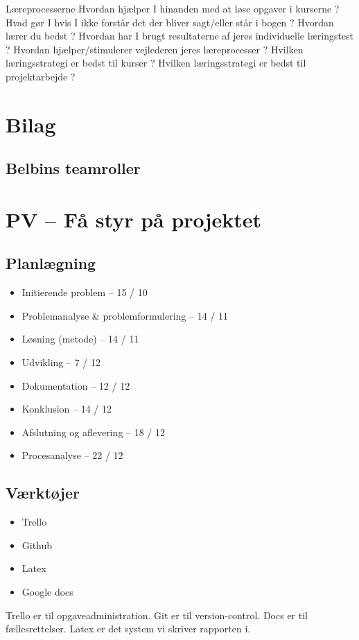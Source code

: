 \documentclass[oneside,a4paper,titlepage]{article}
\begin{document}
Læreprocesserne
Hvordan hjælper I hinanden med at løse opgaver i kurserne ?
Hvad gør I hvis I ikke forstår det der bliver sagt/eller står i bogen ?
Hvordan lærer du bedst ?
Hvordan har I brugt resultaterne af jeres individuelle læringstest ?
Hvordan hjælper/stimulerer vejlederen jeres læreprocesser ?
Hvilken læringsstrategi er bedst til kurser ?
Hvilken læringsstrategi er bedst til projektarbejde ?


\clearpage
\section{Bilag}

\subsection{Belbins teamroller}
\label{sec:styr_paa_projektet}
\section*{PV – Få styr på projektet}
\subsection*{Planlægning}
\begin{itemize}
  \item Initierende problem – 15 / 10
  \item Problemanalyse \& problemformulering – 14 / 11
  \item Løsning (metode) – 14 / 11
  \item Udvikling – 7 / 12
  \item Dokumentation – 12 / 12
  \item Konklusion – 14 / 12
  \item Afslutning og aflevering – 18 / 12
  \item Procesanalyse – 22 / 12
\end{itemize}

\subsection*{Værktøjer}
\begin{itemize}
  \item Trello
  \item Github
  \item Latex
  \item Google docs
\end{itemize}
Trello er til opgaveadministration.
Git er til version-control.
Docs er til fællesrettelser.
Latex er det system vi skriver rapporten i.
\end{document}
